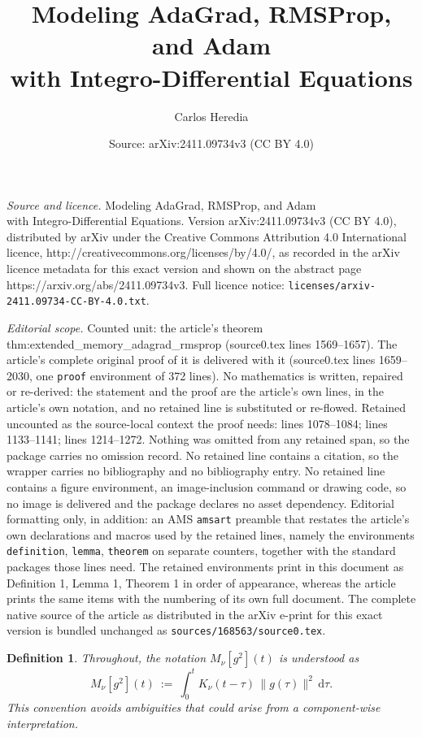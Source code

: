 \documentclass[10pt,a4paper]{amsart}
\title{Modeling AdaGrad, RMSProp, and Adam \\ with Integro-Differential Equations}
\author{Carlos Heredia}
\date{Source: arXiv:2411.09734v3 (CC BY 4.0)}
\newtheorem{definition}{Definition}
\begin{document}
\maketitle

\noindent\emph{Source and licence.} Modeling AdaGrad, RMSProp, and Adam \\ with Integro-Differential Equations. Version arXiv:2411.09734v3 (CC BY 4.0), distributed by arXiv under the Creative Commons Attribution 4.0 International licence, http://creativecommons.org/licenses/by/4.0/, as recorded in the arXiv licence metadata for this exact version and shown on the abstract page https://arxiv.org/abs/2411.09734v3. Full licence notice: \texttt{licenses/arxiv-2411.09734-CC-BY-4.0.txt}.\par\smallskip

\noindent\textit{Editorial scope.} Counted unit: the article's theorem thm:extended\_memory\_adagrad\_rmsprop (source0.tex lines 1569--1657). The article's complete original proof of it is delivered with it (source0.tex lines 1659--2030, one \texttt{proof} environment of 372 lines). No mathematics is written, repaired or re-derived: the statement and the proof are the article's own lines, in the article's own notation, and no retained line is substituted or re-flowed.  Retained uncounted as the source-local context the proof needs: lines 1078--1084; lines 1133--1141; lines 1214--1272.  Nothing was omitted from any retained span, so the package carries no omission record.  No retained line contains a citation, so the wrapper carries no bibliography and no bibliography entry.  No retained line contains a figure environment, an image-inclusion command or drawing code, so no image is delivered and the package declares no asset dependency.  Editorial formatting only, in addition: an AMS \texttt{amsart} preamble that restates the article's own declarations and macros used by the retained lines, namely the environments \texttt{definition}, \texttt{lemma}, \texttt{theorem} on separate counters, together with the standard packages those lines need.  The retained environments print in this document as Definition 1, Lemma 1, Theorem 1 in order of appearance, whereas the article prints the same items with the numbering of its own full document.  The complete native source of the article as distributed in the arXiv e-print for this exact version is bundled unchanged as \texttt{sources/168563/source0.tex}.
\begin{definition}\label{def:M}
Throughout, the notation \(M_\nu[g^2](t)\) is understood as
\[
    M_\nu[g^2](t) \ :=\ \int_0^t K_\nu(t-\tau)\,\|g(\tau)\|^2\,\mathrm{d}\tau.
\]
This convention avoids ambiguities that could arise from a component-wise interpretation.
\end{definition}
\end{document}

